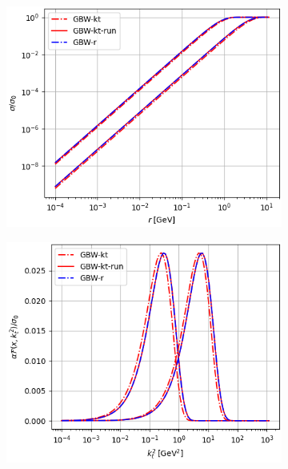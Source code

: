 \documentclass[12pt]{article}
\numberwithin{equation}{section}
\numberwithin{table}{section}
\numberwithin{figure}{section}
\begin{document}
\begin{figure}[t]
	\centering
\begin{subfigure}{0.47\textwidth}
\includegraphics[width=\textwidth]{./plots/GBW-dipole.png}
\end{subfigure}
\begin{subfigure}{0.47\textwidth}
\includegraphics[width=\textwidth]{./plots/GBW-gluon.png}
\end{subfigure}


\end{figure}
\end{document}
